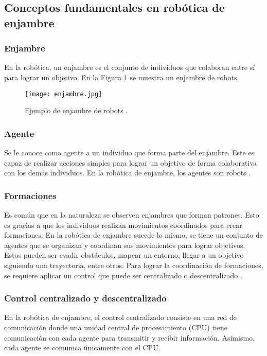 \subsection*{Conceptos fundamentales en robótica de enjambre}

\subsubsection*{Enjambre}
En la robótica, un enjambre es el conjunto de individuos que colaboran entre sí para lograr un objetivo. En la Figura \ref{fig:enjambre} se muestra un enjambre de robots.

\begin{figure}[H]
	\centering
	\texttt{[image: enjambre.jpg]}
	\caption{Ejemplo de enjambre de robots \cite{imgEnjambre}.}
	\label{fig:enjambre}
\end{figure}

\subsubsection*{Agente}
Se le conoce como agente a un individuo que forma parte del enjambre. Este es capaz de realizar acciones simples para lograr un objetivo de forma colaborativa con los demás individuos. En la robótica de enjambre, los agentes son robots \cite{definiciones_robotica_enjambre}.

\subsubsection*{Formaciones}
Es común que en la naturaleza se observen enjambres que forman patrones. Esto es gracias a que los individuos realizan movimientos coordinados para crear formaciones. En la robótica de enjambre sucede lo mismo, se tiene un conjunto de agentes que se organizan y coordinan sus movimientos para lograr objetivos. Estos pueden ser evadir obstáculos, mapear un entorno, llegar a un objetivo siguiendo una trayectoria, entre otros. Para lograr la coordinación de formaciones, se requiere aplicar un control que puede ser centralizado o descentralizado \cite{definiciones_robotica_enjambre}.

\subsubsection*{Control centralizado y descentralizado}
En la robótica de enjambre, el control centralizado consiste en una red de comunicación donde una unidad central de procesamiento (CPU) tiene comunicación con cada agente para transmitir y recibir información. Asimismo, cada agente se comunica únicamente con el CPU.

